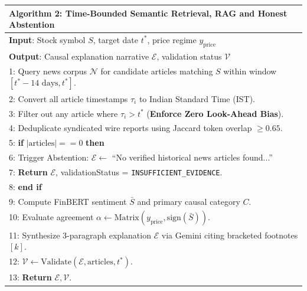 \documentclass{article}
\begin{document}
	\begin{center}
	\begin{tabular}{|p{}|}
	\hline
	\textbf{Algorithm 2: Time-Bounded Semantic Retrieval, RAG and Honest Abstention} \\
	\hline
	\textbf{Input}: Stock symbol $S$, target date $t^*$, price regime $y_{\text{price}}$ \\
	\textbf{Output}: Causal explanation narrative $\mathcal{E}$, validation status $\mathcal{V}$ \\
	1: Query news corpus $\mathcal{N}$ for candidate articles matching $S$ within window $[t^* - 14\text{ days}, t^*]$. \\
	2: Convert all article timestamps $\tau_i$ to Indian Standard Time (IST). \\
	3: Filter out any article where $\tau_i > t^*$ (\textbf{Enforce Zero Look-Ahead Bias}). \\
	4: Deduplicate syndicated wire reports using Jaccard token overlap $\ge 0.65$. \\
	5: \textbf{if} $|\text{articles}| == 0$ \textbf{then} \\
	6: \quad Trigger Abstention: $\mathcal{E} \leftarrow$ ``No verified historical news articles found...'' \\
	7: \quad \textbf{Return} $\mathcal{E}$, validationStatus = \texttt{INSUFFICIENT\_EVIDENCE}. \\
	8: \textbf{end if} \\
	9: Compute FinBERT sentiment $\bar{S}$ and primary causal category $C$. \\
	10: Evaluate agreement $\alpha \leftarrow \text{Matrix}(y_{\text{price}}, \text{sign}(\bar{S}))$. \\
	11: Synthesize 3-paragraph explanation $\mathcal{E}$ via Gemini citing bracketed footnotes $[k]$. \\
	12: $\mathcal{V} \leftarrow \text{Validate}(\mathcal{E}, \text{articles}, t^*)$. \\
	13: \textbf{Return} $\mathcal{E}, \mathcal{V}$. \\
	\hline
	\end{tabular}
	\end{center}
\end{document}
